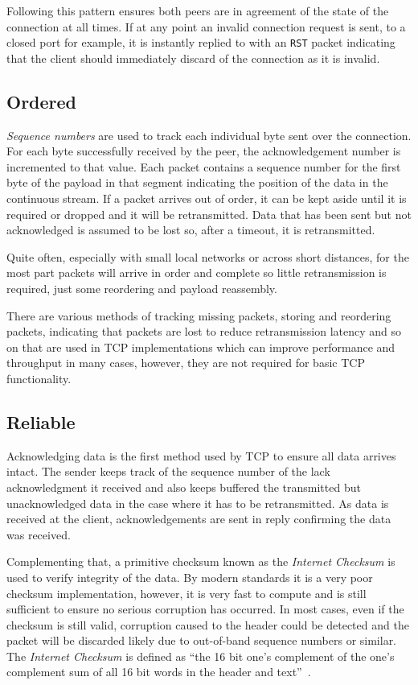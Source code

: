 \documentclass[11pt,a4paper,british]{bhamarticle}
\begin{document}
\begin{multicols}{2}
Following this pattern ensures both peers are in agreement of the state of the connection at all times. If at any point an invalid connection request is sent, to a closed port for example, it is instantly replied to with an \texttt{RST} packet indicating that the client should immediately discard of the connection as it is invalid.
\subsection{Ordered}
\textit{Sequence numbers} are used to track each individual byte sent over the connection. For each byte successfully received by the peer, the acknowledgement number is incremented to that value. Each packet contains a sequence number for the first byte of the payload in that segment indicating the position of the data in the continuous stream. If a packet arrives out of order, it can be kept aside until it is required or dropped and it will be retransmitted. Data that has been sent but not acknowledged is assumed to be lost so, after a timeout, it is retransmitted.

Quite often, especially with small local networks or across short distances, for the most part packets will arrive in order and complete so little retransmission is required, just some reordering and payload reassembly.

There are various methods of tracking missing packets, storing and reordering packets, indicating that packets are lost to reduce retransmission latency and so on that are used in TCP implementations which can improve performance and throughput in many cases, however, they are not required for basic TCP functionality.

\subsection{Reliable}\label{sec:reliable}
Acknowledging data is the first method used by TCP to ensure all data arrives intact. The sender keeps track of the sequence number of the lack acknowledgment it received and also keeps buffered the transmitted but unacknowledged data in the case where it has to be retransmitted. As data is received at the client, acknowledgements are sent in reply confirming the data was received.

Complementing that, a primitive checksum known as the \textit{Internet Checksum} is used to verify integrity of the data. By modern standards it is a very poor checksum implementation, however, it is very fast to compute and is still sufficient to ensure no serious corruption has occurred. In most cases, even if the checksum is still valid, corruption caused to the header could be detected and the packet will be discarded likely due to out-of-band sequence numbers or similar. The \textit{Internet Checksum} is defined as ``the 16 bit one's complement of the one's complement sum of all 16 bit words in the header and text''~\cite[3.1]{rfc793}.


\end{multicols}
\end{document}
